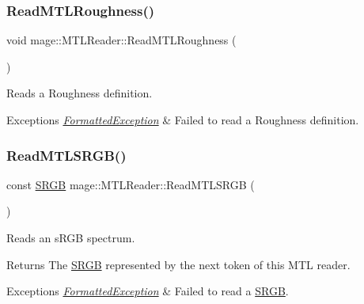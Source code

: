 \subsubsection{\texorpdfstring{Read\+M\+T\+L\+Roughness()}{ReadMTLRoughness()}}
{\footnotesize\ttfamily void mage\+::\+M\+T\+L\+Reader\+::\+Read\+M\+T\+L\+Roughness (\begin{DoxyParamCaption}{ }\end{DoxyParamCaption})\hspace{0.3cm}{\ttfamily [private]}}

Reads a Roughness definition.


\begin{DoxyExceptions}{Exceptions}
{\em \hyperlink{classmage_1_1_formatted_exception}{Formatted\+Exception}} & Failed to read a Roughness definition. \\
\hline
\end{DoxyExceptions}
\hypertarget{classmage_1_1_m_t_l_reader_ac8834c8e38397152d1be0a92874ca767}{}\label{classmage_1_1_m_t_l_reader_ac8834c8e38397152d1be0a92874ca767} 
\subsubsection{\texorpdfstring{Read\+M\+T\+L\+S\+R\+G\+B()}{ReadMTLSRGB()}}
{\footnotesize\ttfamily const \hyperlink{structmage_1_1_s_r_g_b}{S\+R\+GB} mage\+::\+M\+T\+L\+Reader\+::\+Read\+M\+T\+L\+S\+R\+GB (\begin{DoxyParamCaption}{ }\end{DoxyParamCaption})\hspace{0.3cm}{\ttfamily [private]}}

Reads an s\+R\+GB spectrum.

\begin{DoxyReturn}{Returns}
The {\ttfamily \hyperlink{structmage_1_1_s_r_g_b}{S\+R\+GB}} represented by the next token of this M\+TL reader. 
\end{DoxyReturn}

\begin{DoxyExceptions}{Exceptions}
{\em \hyperlink{classmage_1_1_formatted_exception}{Formatted\+Exception}} & Failed to read a {\ttfamily \hyperlink{structmage_1_1_s_r_g_b}{S\+R\+GB}}. \\
\hline
\end{DoxyExceptions}
\hypertarget{classmage_1_1_m_t_l_reader_a815e10592e7d24876b370b8b95d385e5}{}\label{classmage_1_1_m_t_l_reader_a815e10592e7d24876b370b8b95d385e5} 
